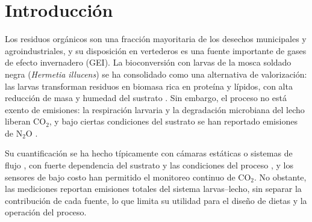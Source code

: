 \section{Introducción}
\label{sec:introduccion}

Los residuos orgánicos son una fracción mayoritaria de los desechos municipales y agroindustriales, y su disposición en vertederos es una fuente importante de gases de efecto invernadero (GEI). La bioconversión con larvas de la mosca soldado negra (\textit{Hermetia illucens}) se ha consolidado como una alternativa de valorización: las larvas transforman residuos en biomasa rica en proteína y lípidos, con alta reducción de masa y humedad del sustrato \parencite{mertenatBlackSoldierFly2019,nayakHermetiaIllucensDiptera2023}. Sin embargo, el proceso no está exento de emisiones: la respiración larvaria y la degradación microbiana del lecho liberan CO$_2$, y bajo ciertas condiciones del sustrato se han reportado emisiones de N$_2$O \parencite{ermolaevGreenhouseGasEmissions2019,parodiBioconversionEfficienciesGreenhouse2020a,boakye-yiadomGreenhouseGasEmissions2022,lindbergProcessEfficiencyGreenhouse2022a}.

Su cuantificación se ha hecho típicamente con cámaras estáticas o sistemas de flujo \parencite{hutchinsonMethodsSoilAnalysis1992}, con fuerte dependencia del sustrato y las condiciones del proceso \parencite{parodiBioconversionEfficienciesGreenhouse2020a,boakye-yiadomGreenhouseGasEmissions2022}, y los sensores de bajo costo han permitido el monitoreo continuo de CO$_2$. No obstante, las mediciones reportan emisiones totales del sistema larvas--lecho, sin separar la contribución de cada fuente, lo que limita su utilidad para el diseño de dietas y la operación del proceso.


